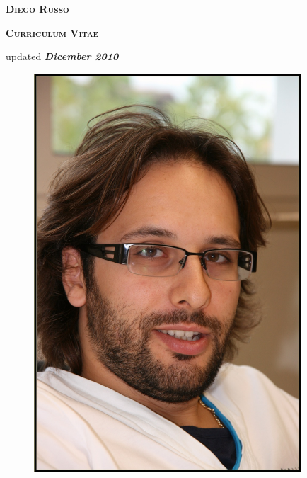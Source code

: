 \documentclass[totpages,helvetica,openbib,english]{europecv}
\begin{document}
    \begin{center}
        \hspace{1pt}
        \vspace{2cm}
    
        {\scshape \textbf{\Huge Diego Russo}}
    
        \vspace{1cm}
    
        {\scshape \textbf{\large \underline{Curriculum Vitae}}}
    
        \vspace{0.25cm}
    
        updated \emph{\textbf{Dicember 2010}}
        
        \vspace{2cm}
        
        \begin{figure}[htbp] 
            \begin{center} 
                \includegraphics[width=10cm]{io.jpg}
            \end{center} 
        \end{figure}
        
    \end{center}
\pagebreak
{}
\end{document}
